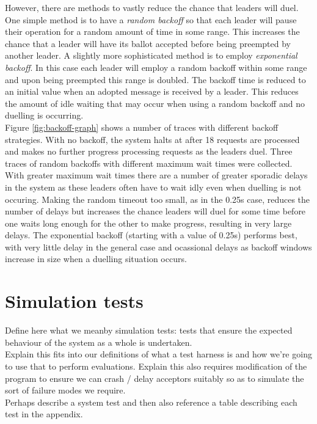 However, there are methods to vastly reduce the chance that leaders will duel. One simple method is to have a \emph{random backoff} so that each leader will pause their operation for a random amount of time in some range. This increases the chance that a leader will have its ballot accepted before being preempted by another leader. A slightly more sophisticated method is to employ \emph{exponential backoff}. In this case each leader will employ a random backoff within some range and upon being preempted this range is doubled. The backoff time is reduced to an initial value when an adopted message is received by a leader. This reduces the amount of idle waiting that may occur when using a random backoff and no duelling is occurring. \\

Figure \ref{fig:backoff-graph} shows a number of traces with different backoff strategies. With no backoff, the system halts at after 18 requests are processed and makes no further progress processing requests as the leaders duel. Three traces of random backoffs with different maximum wait times were collected. With greater maximum wait times there are a number of greater sporadic delays in the system as these leaders often have to wait idly even when duelling is not occuring. Making the random timeout too small, as in the 0.25s case, reduces the number of delays but increases the chance leaders will duel for some time before one waits long enough for the other to make progress, resulting in very large delays. The exponential backoff (starting with a value of 0.25s) performs best, with very little delay in the general case and ocassional delays as backoff windows increase in size when a duelling situation occurs.

{\color{green}\section{Simulation tests}

Define here what we  meanby simulation tests: tests that ensure the expected behaviour of the system as a whole is undertaken. \\

Explain this fits into our definitions of what a test harness is and how we're going to use that to perform evaluations. Explain this also requires modification of the program to ensure we can crash / delay acceptors suitably so as to simulate the sort of failure modes we require. \\

Perhaps describe a system test and then also reference a table describing each test in the appendix. \\}


